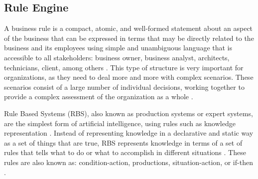 \subsection{Rule Engine}


A business rule is a compact, atomic, and well-formed statement about an aspect of the business that can be expressed in terms that may be directly related to the business and its employees using simple and unambiguous language that is accessible to all stakeholders: business owner, business analyst, architects, technicians, client, among others \cite{graham2007}. This type of structure is very important for organizations, as they need to deal more and more with complex scenarios. These scenarios consist of a large number of individual decisions, working together to provide a complex assessment of the organization as a whole \cite{salatino2016}.


Rule Based Systems (RBS), also known as production systems or expert systems, are the simplest form of artificial intelligence, using rules such as knowledge representation \cite{grosan2011}. Instead of representing knowledge in a declarative and static way as a set of things that are true, RBS represents knowledge in terms of a set of rules that tells what to do or what to accomplish in different situations \cite{grosan2011}. These rules are also known as: condition-action, productions, situation-action, or if-then \cite{russell2010}.

